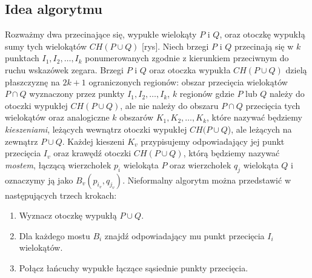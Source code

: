 \subsection{Idea algorytmu}
Rozważmy dwa przecinające się, wypukłe wielokąty $P$ i $Q$, oraz
otoczkę wypukłą sumy tych wielokątów $CH(P \cup Q)$ [rys]. Niech
brzegi $P$ i $Q$ przecinają się w $k$ punktach $I_1, I_2, \ldots, I_k$
ponumerowanych zgodnie z kierunkiem przeciwnym do ruchu wskazówek
zegara. Brzegi $P$ i $Q$ oraz otoczka wypukła $CH(P \cup Q)$ dzielą
płaszczyznę na $2k + 1$ ograniczonych regionów: obszar przecięcia
wielokątów $P \cap Q$ wyznaczony przez punkty $I_1, I_2, \ldots, I_k$,
$k$ regionów gdzie $P$ lub $Q$ należy do otoczki wypukłej $CH(P \cup
Q)$, ale nie należy do obszaru $P \cap Q$ przecięcia tych wielokątów
oraz analogiczne $k$ obszarów $K_1, K_2, \ldots, K_k$, które nazywać
będziemy \emph{kieszeniami}, leżących wewnątrz otoczki wypukłej $CH(P
\cup Q$), ale leżących na zewnątrz $P \cup Q$. Każdej kieszeni $K_v$
przypisujemy odpowiadający jej punkt przecięcia $I_v$ oraz krawędź
otoczki $CH(P \cup Q)$, którą będziemy nazywać \emph{mostem}, łączącą
wierzchołek $p_i$ wielokąta $P$ oraz wierzchołek $q_j$ wielokąta $Q$ i
oznaczymy ją jako $B_{v}(p_{i_v}, q_{j_v})$. Nieformalny algorytm
można przedstawić w następujących trzech krokach:

\begin{enumerate}
\item Wyznacz otoczkę wypukłą $P \cup Q$.
\item Dla każdego mostu $B_i$ znajdź odpowiadający mu punkt przecięcia
  $I_i$ wielokątów.
\item Połącz łańcuchy wypukłe łączące sąsiednie punkty przecięcia.
\end{enumerate}

